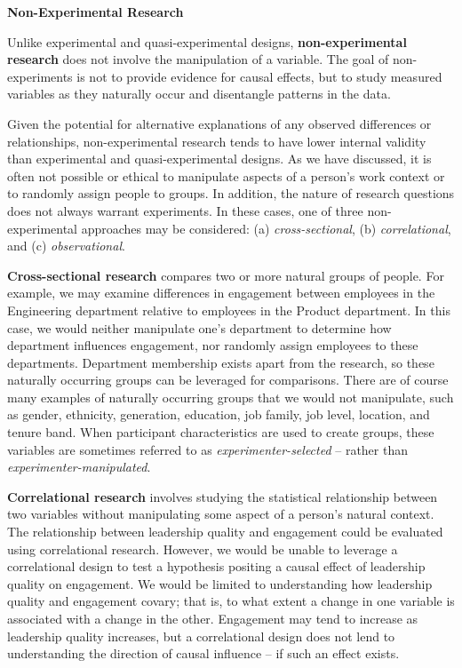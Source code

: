 \documentclass[
]{book}
\begin{document}
\textbf{Non-Experimental Research}

Unlike experimental and quasi-experimental designs, \textbf{non-experimental research} does not involve the manipulation of a variable. The goal of non-experiments is not to provide evidence for causal effects, but to study measured variables as they naturally occur and disentangle patterns in the data.

Given the potential for alternative explanations of any observed differences or relationships, non-experimental research tends to have lower internal validity than experimental and quasi-experimental designs. As we have discussed, it is often not possible or ethical to manipulate aspects of a person's work context or to randomly assign people to groups. In addition, the nature of research questions does not always warrant experiments. In these cases, one of three non-experimental approaches may be considered: (a) \emph{cross-sectional}, (b) \emph{correlational}, and (c) \emph{observational}.

\textbf{Cross-sectional research} compares two or more natural groups of people. For example, we may examine differences in engagement between employees in the Engineering department relative to employees in the Product department. In this case, we would neither manipulate one's department to determine how department influences engagement, nor randomly assign employees to these departments. Department membership exists apart from the research, so these naturally occurring groups can be leveraged for comparisons. There are of course many examples of naturally occurring groups that we would not manipulate, such as gender, ethnicity, generation, education, job family, job level, location, and tenure band. When participant characteristics are used to create groups, these variables are sometimes referred to as \emph{experimenter-selected} -- rather than \emph{experimenter-manipulated}.

\textbf{Correlational research} involves studying the statistical relationship between two variables without manipulating some aspect of a person's natural context. The relationship between leadership quality and engagement could be evaluated using correlational research. However, we would be unable to leverage a correlational design to test a hypothesis positing a causal effect of leadership quality on engagement. We would be limited to understanding how leadership quality and engagement covary; that is, to what extent a change in one variable is associated with a change in the other. Engagement may tend to increase as leadership quality increases, but a correlational design does not lend to understanding the direction of causal influence -- if such an effect exists.
\end{document}

